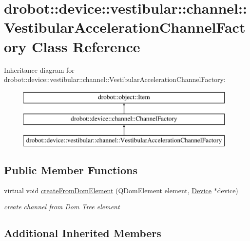 \hypertarget{classdrobot_1_1device_1_1vestibular_1_1channel_1_1VestibularAccelerationChannelFactory}{\section{drobot\-:\-:device\-:\-:vestibular\-:\-:channel\-:\-:Vestibular\-Acceleration\-Channel\-Factory Class Reference}
\label{classdrobot_1_1device_1_1vestibular_1_1channel_1_1VestibularAccelerationChannelFactory}
}
Inheritance diagram for drobot\-:\-:device\-:\-:vestibular\-:\-:channel\-:\-:Vestibular\-Acceleration\-Channel\-Factory\-:\begin{figure}[H]
\begin{center}
\leavevmode
\includegraphics[height=3.000000cm]{classdrobot_1_1device_1_1vestibular_1_1channel_1_1VestibularAccelerationChannelFactory}
\end{center}
\end{figure}
\subsection*{Public Member Functions}
\begin{DoxyCompactItemize}
\item 
virtual void \hyperlink{classdrobot_1_1device_1_1vestibular_1_1channel_1_1VestibularAccelerationChannelFactory_a79214e8381183d99c9f27fc2abe41e59}{create\-From\-Dom\-Element} (Q\-Dom\-Element element, \hyperlink{classdrobot_1_1device_1_1Device}{Device} $\ast$device)
\begin{DoxyCompactList}\small\item\em create channel from Dom Tree element \end{DoxyCompactList}\end{DoxyCompactItemize}
\subsection*{Additional Inherited Members}


